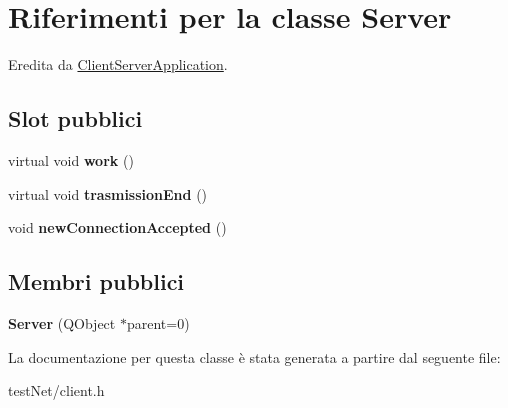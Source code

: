 \hypertarget{class_server}{\section{Riferimenti per la classe Server}
\label{class_server}
}


Eredita da \hyperlink{class_client_server_application}{Client\-Server\-Application}.

\subsection*{Slot pubblici}
\begin{DoxyCompactItemize}
\item 
\hypertarget{class_server_a921d801498e3fa3cf02f2ff8e0725e69}{virtual void {\bfseries work} ()}\label{class_server_a921d801498e3fa3cf02f2ff8e0725e69}

\item 
\hypertarget{class_server_a7ed66fab76ec1c3ce4aecb030d274b27}{virtual void {\bfseries trasmission\-End} ()}\label{class_server_a7ed66fab76ec1c3ce4aecb030d274b27}

\item 
\hypertarget{class_server_af3c3f5d6a89f25bf169ab2a9aa506f5c}{void {\bfseries new\-Connection\-Accepted} ()}\label{class_server_af3c3f5d6a89f25bf169ab2a9aa506f5c}

\end{DoxyCompactItemize}
\subsection*{Membri pubblici}
\begin{DoxyCompactItemize}
\item 
\hypertarget{class_server_a1950ac036d86af898428d7ba39bbf048}{{\bfseries Server} (Q\-Object $\ast$parent=0)}\label{class_server_a1950ac036d86af898428d7ba39bbf048}

\end{DoxyCompactItemize}


La documentazione per questa classe è stata generata a partire dal seguente file\-:\begin{DoxyCompactItemize}
\item 
test\-Net/client.\-h\end{DoxyCompactItemize}
